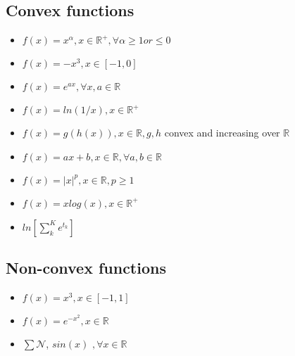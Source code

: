 \subsection{Convex functions}
\begin{itemize}
\item $f(x) = x^{\alpha}, x \in \mathbb{R^+}, \forall \alpha \ge 1 or \le 0$
\item $f(x) = -x^3, x \in [-1,0]$
\item $f(x) = e^{ax}, \forall x,a \in \mathbb{R}$
\item $f(x) = ln(1/x), x \in \mathbb{R^+}$
\item $f(x) = g(h(x)), x \in \mathbb{R}, g,h$ convex and increasing over $\mathbb{R}$
\item $f(x) = ax+b, x \in \mathbb{R}, \forall a,b \in \mathbb{R}$
\item $f(x) = |x|^p, x \in \mathbb{R}, p\ge 1$
\item $f(x) = xlog(x), x \in \mathbb{R}^+$
\item $ln[\sum_k^Ke^{t_k}]$
\end{itemize}

\subsection{Non-convex functions}
\begin{itemize}
\item $f(x) = x^3, x \in [-1,1]$
\item $f(x) = e^{-x^2}, x \in \mathbb{R}$
\item $\sum \mathcal{N}$, $sin(x)\,\, , \forall x \in \mathbb{R}$ \newline
\end{itemize}
